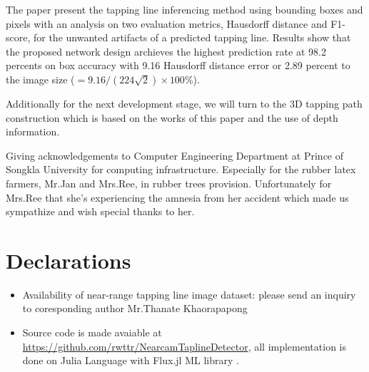 \documentclass[default,pdflatex,iicol]{sn-jnl}%
\begin{document}
The paper present the tapping line inferencing method using bounding boxes and pixels with an analysis on two evaluation metrics, Hausdorff distance and F1-score, for the unwanted artifacts of a predicted tapping line. Results show that the proposed network design archieves the highest prediction rate at 98.2 percents on box accuracy with 9.16 Hausdorff distance error or 2.89 percent to the image size ($=9.16/(224\sqrt2)\times100\%$).

Additionally for the next development stage, we will turn to the 3D tapping path construction which is based on the works of this paper and the use of depth information.

\backmatter

Giving acknowledgements to Computer Engineering Department at Prince of Songkla University for computing infrastructure. Especially for the rubber latex farmers, Mr.Jan and Mrs.Ree, in rubber trees provision. Unfortunately for Mrs.Ree that she's experiencing the amnesia from her accident which made us sympathize and wish special thanks to her.

\section*{Declarations}
\begin{itemize}
\item Availability of near-range tapping line image dataset: please send an inquiry to coresponding author Mr.Thanate Khaorapapong
\item Source code is made avaiable at \url{https://github.com/rwttr/NearcamTaplineDetector}, all implementation is done on Julia Language with Flux.jl ML library \cite{innes2018}.
\end{itemize}



\end{document}
